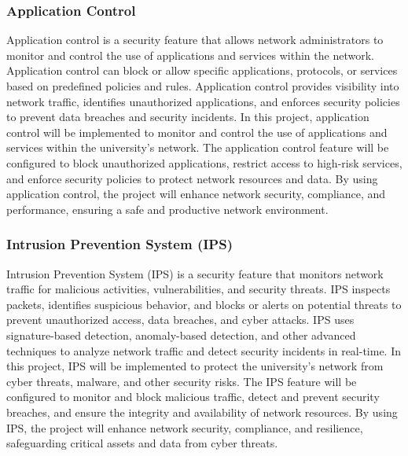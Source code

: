 \documentclass[12pt]{report}
\begin{document}
\subsubsection{Application Control}
Application control is a security feature that allows network administrators to monitor and control the use of applications and services within the network. Application control can block or allow specific applications, protocols, or services based on predefined policies and rules. Application control provides visibility into network traffic, identifies unauthorized applications, and enforces security policies to prevent data breaches and security incidents. In this project, application control will be implemented to monitor and control the use of applications and services within the university's network. The application control feature will be configured to block unauthorized applications, restrict access to high-risk services, and enforce security policies to protect network resources and data. By using application control, the project will enhance network security, compliance, and performance, ensuring a safe and productive network environment. \cite{AppControl}
\subsubsection{Intrusion Prevention System (IPS)}
Intrusion Prevention System (IPS) is a security feature that monitors network traffic for malicious activities, vulnerabilities, and security threats. IPS inspects packets, identifies suspicious behavior, and blocks or alerts on potential threats to prevent unauthorized access, data breaches, and cyber attacks. IPS uses signature-based detection, anomaly-based detection, and other advanced techniques to analyze network traffic and detect security incidents in real-time. In this project, IPS will be implemented to protect the university's network from cyber threats, malware, and other security risks. The IPS feature will be configured to monitor and block malicious traffic, detect and prevent security breaches, and ensure the integrity and availability of network resources. By using IPS, the project will enhance network security, compliance, and resilience, safeguarding critical assets and data from cyber threats. \cite{IPS}
\end{document}

